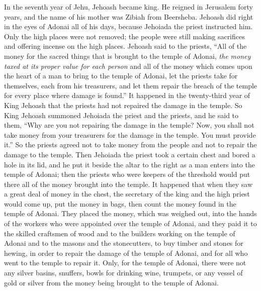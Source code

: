 \begin{biblechapter} %
 In the seventh year of Jehu, Jehoash became king. He reigned in Jerusalem forty years, and the name of his mother was Zibiah from Beersheba.
\verse Jehoash did right in the eyes of Adonai all of his days, because Jehoiada the priest instructed him.
\verse Only the high places were not removed; the people were still making sacrifices and offering incense on the high places.
 Jehoash said to the priests, “All of the money for the sacred things that is brought to the temple of Adonai, \textit{the money taxed at its proper value for each person} and all of the money which comes upon the heart of a man to bring to the temple of Adonai,
\verse let the priests take for themselves, each from his treasurers, and let them repair the breach of the temple for every place where damage is found.”
\verse It happened in the twenty-third year of King Jehoash that the priests had not repaired the damage in the temple.
\verse So King Jehoash summoned Jehoiada the priest and the priests, and he said to them, “Why are you not repairing the damage in the temple? Now, you shall not take money from your treasurers for the damage in the temple. You must provide it.”
\verse So the priests agreed not to take money from the people and not to repair the damage to the temple.
\verse Then Jehoiada the priest took a certain chest and bored a hole in its lid, and he put it beside the altar to the right as a man enters into the temple of Adonai; then the priests who were keepers of the threshold would put there all of the money brought into the temple.
\verse It happened that when they saw a great deal of money in the chest, the secretary of the king and the high priest would come up, put the money in bags, then count the money found in the temple of Adonai.
\verse They placed the money, which was weighed out, into the hands of the workers who were appointed over the temple of Adonai, and they paid it to the skilled craftsmen of wood and to the builders working on the temple of Adonai
\verse and to the masons and the stonecutters, to buy timber and stones for hewing, in order to repair the damage of the temple of Adonai, and for all who went to the temple to repair it.
\verse Only, for the temple of Adonai, there were not any silver basins, snuffers, bowls for drinking wine, trumpets, or any vessel of gold or silver from the money being brought to the temple of Adonai.

\end{biblechapter}
